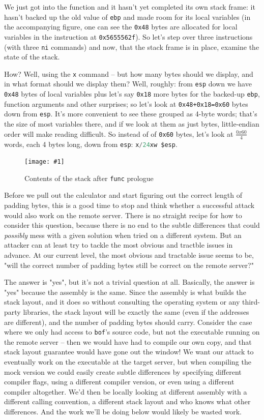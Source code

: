 \documentclass{article}
\newcommand{\displayimagecap}[2] {
\begin{figure}
    \centering
    \texttt{[image: \#1]} 
    \caption{#2}
\end{figure}
}
\newcommand{\xcode}[2]{\colorbox{ubuntuback}{\lstinline[language=#1]|#2|}}
\newcommand{\asm}[1]{\xcode{{[x86masm]assembler}}{#1}}
\newcommand{\code}[1]{\colorbox{ubuntuback}{\texttt{#1}}}
\newcommand{\gdb}[1]{\xcode{C}{#1}}
\begin{document}
We just got into the function and it hasn't yet completed its own stack frame: it hasn't backed up the old value of \asm{ebp} and made room for its local variables (in the accompanying figure, one can see the \code{0x48} bytes are allocated for local variables in the instruction at \code{0x5655562f}). So let's step over three instructions (with three \gdb{ni} commands) and now, that the stack frame is in place, examine the state of the stack. 

How? Well, using the \gdb{x} command -- but how many bytes should we display, and in what format should we display them? Well, roughly: from \asm{esp} down we have \code{0x48} bytes of local variables plus let's say \code{0x18} more bytes for the backed-up \asm{ebp}, function arguments and other surprises; so let's look at \code{0x48+0x18=0x60} bytes down from \asm{esp}. It's more convenient to see these grouped as 4-byte words; that's the size of most variables there, and if we look at them as just bytes, little-endian order will make reading difficult. So instead of of \code{0x60} bytes, let's look at $\frac{0x60}{4}$ words, each 4 bytes long, down from \asm{esp}: \gdb{x/24xw $esp}.

\displayimagecap{./exercises/02_bof/stack_view.png}{Contents of the stack after \code{func} prologue}

Before we pull out the calculator and start figuring out the correct length of padding bytes, this is a good time to stop and think whether a successful attack would also work on the remote server. There is no straight recipe for how to consider this question, because there is no end to the subtle differences that could \textit{possibly} mess with a given solution when tried on a different system. But an attacker can at least try to tackle the most obvious and tractble issues in advance. At our current level, the most obvious and tractable issue seems to be, "will the correct number of padding bytes still be correct on the remote server?"

The answer is "yes", but it's not a trivial question at all. Basically, the answer is "yes" because the assembly is the same. Since the assembly is what builds the stack layout, and it does so without consulting the operating system or any third-party libraries, the stack layout will be exactly the same (even if the addresses are different), and the number of padding bytes should carry. Consider the case where we only had access to \xcode{bash}{bof}'s source code, but not the executable running on the remote server -- then we would have had to compile our own copy, and that stack layout guarantee would have gone out the window! We want our attack to eventually work on the executable at the target server, but when compiling the mock version we could easily create subtle differences by specifying different compiler flags, using a different compiler version, or even using a different compiler altogether. We'd then be locally looking at different assembly with a different calling convention, a different stack layout and who knows what other differences. And the work we'll be doing below would likely be wasted work.
\end{document}
